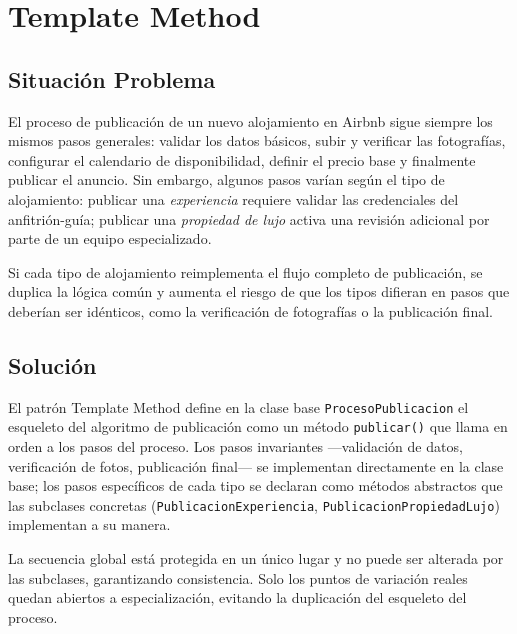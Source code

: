 
\chapter{Template Method}

\section{Situación Problema}

El proceso de publicación de un nuevo alojamiento en Airbnb sigue siempre
los mismos pasos generales: validar los datos básicos, subir y verificar
las fotografías, configurar el calendario de disponibilidad, definir el
precio base y finalmente publicar el anuncio. Sin embargo, algunos pasos
varían según el tipo de alojamiento: publicar una \emph{experiencia}
requiere validar las credenciales del anfitrión-guía; publicar una
\emph{propiedad de lujo} activa una revisión adicional por parte de
un equipo especializado.

Si cada tipo de alojamiento reimplementa el flujo completo de publicación,
se duplica la lógica común y aumenta el riesgo de que los tipos difieran
en pasos que deberían ser idénticos, como la verificación de fotografías
o la publicación final.

\section{Solución}

El patrón Template Method define en la clase base
\texttt{ProcesoPublicacion} el esqueleto del algoritmo de publicación
como un método \texttt{publicar()} que llama en orden a los pasos del
proceso. Los pasos invariantes —validación de datos, verificación de
fotos, publicación final— se implementan directamente en la clase base;
los pasos específicos de cada tipo se declaran como métodos abstractos
que las subclases concretas (\texttt{PublicacionExperiencia},
\texttt{PublicacionPropiedadLujo}) implementan a su manera.

La secuencia global está protegida en un único lugar y no puede ser
alterada por las subclases, garantizando consistencia. Solo los puntos
de variación reales quedan abiertos a especialización, evitando la
duplicación del esqueleto del proceso.

